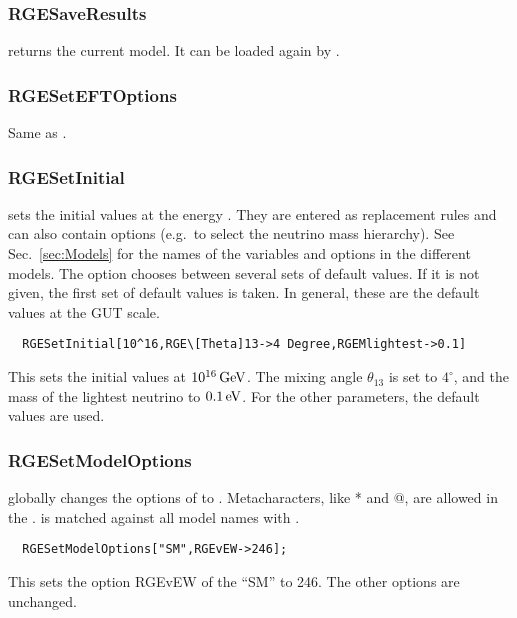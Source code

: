 \documentclass[10pt,a4paper,twoside]{scrartcl}
\begin{document}
\subsubsection{RGESaveResults}

 returns the current model. It can be loaded again by .

\subsubsection{RGESetEFTOptions}

Same as .

\subsubsection{RGESetInitial}

 sets
the initial values at the energy .  They are entered as
replacement rules and can also contain options (e.g.\ to select the
neutrino mass hierarchy).  See Sec.~\ref{sec:Models} for the names of
the variables and options in the different models.
The option  chooses between
several sets of default values. If it is not given, the first set of default
values is taken.  In general, these are the default values at the GUT scale.

\begin{verbatim}
  RGESetInitial[10^16,RGE\[Theta]13->4 Degree,RGEMlightest->0.1]
\end{verbatim}
This sets the initial values at $10^{16}\,\mathrm{GeV}$.  The mixing angle
$\theta_{13}$ is set to $4^\circ$, and the mass of the lightest neutrino
to $0.1\,\mathrm{eV}$.  For the other parameters, the default values are used.



\subsubsection{RGESetModelOptions}

 globally changes the options
of  to . Metacharacters, like * and @, are
allowed in the .  is matched against all
model names with .

\begin{verbatim}
  RGESetModelOptions["SM",RGEvEW->246];
\end{verbatim}
This sets the option RGEvEW of the ``SM'' to 246.  The other options are
unchanged.
\end{document}
